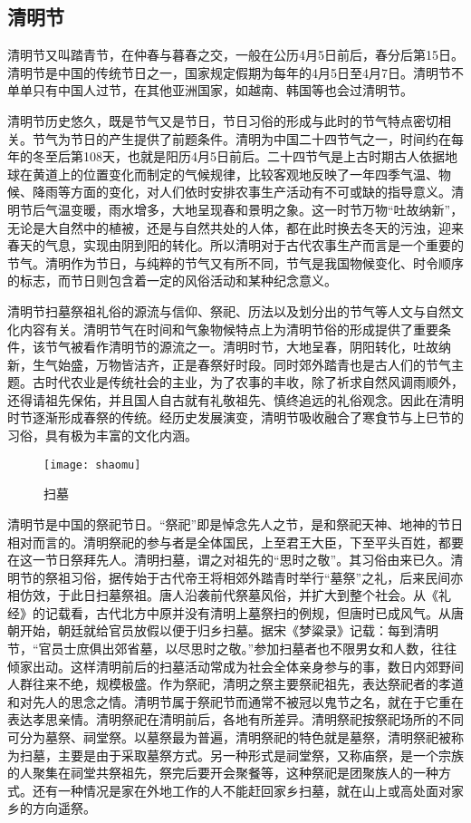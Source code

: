 \subsection{清明节}

清明节又叫踏青节，在仲春与暮春之交，一般在公历4月5日前后，春分后第15日。清明节是中国的传统节日之一，国家规定假期为每年的4月5日至4月7日。清明节不单单只有中国人过节，在其他亚洲国家，如越南、韩国等也会过清明节。

清明节历史悠久，既是节气又是节日，节日习俗的形成与此时的节气特点密切相关。节气为节日的产生提供了前题条件。清明为中国二十四节气之一，时间约在每年的冬至后第108天，也就是阳历4月5日前后。二十四节气是上古时期古人依据地球在黄道上的位置变化而制定的气候规律，比较客观地反映了一年四季气温、物候、降雨等方面的变化，对人们依时安排农事生产活动有不可或缺的指导意义。清明节后气温变暖，雨水增多，大地呈现春和景明之象。这一时节万物“吐故纳新”，无论是大自然中的植被，还是与自然共处的人体，都在此时换去冬天的污浊，迎来春天的气息，实现由阴到阳的转化。所以清明对于古代农事生产而言是一个重要的节气。清明作为节日，与纯粹的节气又有所不同，节气是我国物候变化、时令顺序的标志，而节日则包含着一定的风俗活动和某种纪念意义。

清明节扫墓祭祖礼俗的源流与信仰、祭祀、历法以及划分出的节气等人文与自然文化内容有关。清明节气在时间和气象物候特点上为清明节俗的形成提供了重要条件，该节气被看作清明节的源流之一。清明时节，大地呈春，阴阳转化，吐故纳新，生气始盛，万物皆洁齐，正是春祭好时段。同时郊外踏青也是古人们的节气主题。古时代农业是传统社会的主业，为了农事的丰收，除了祈求自然风调雨顺外，还得请祖先保佑，并且国人自古就有礼敬祖先、慎终追远的礼俗观念。因此在清明时节逐渐形成春祭的传统。经历史发展演变，清明节吸收融合了寒食节与上巳节的习俗，具有极为丰富的文化内涵。
\begin{figure}[htb]
    \centering
    \texttt{[image: shaomu]}
    \caption{扫墓}
\end{figure}


清明节是中国的祭祀节日。“祭祀”即是悼念先人之节，是和祭祀天神、地神的节日相对而言的。清明祭祀的参与者是全体国民，上至君王大臣，下至平头百姓，都要在这一节日祭拜先人。清明扫墓，谓之对祖先的“思时之敬”。其习俗由来已久。清明节的祭祖习俗，据传始于古代帝王将相郊外踏青时举行“墓祭”之礼，后来民间亦相仿效，于此日扫墓祭祖。唐人沿袭前代祭墓风俗，并扩大到整个社会。从《礼经》的记载看，古代北方中原并没有清明上墓祭扫的例规，但唐时已成风气。从唐朝开始，朝廷就给官员放假以便于归乡扫墓。据宋《梦粱录》记载：每到清明节，“官员士庶俱出郊省墓，以尽思时之敬。”参加扫墓者也不限男女和人数，往往倾家出动。这样清明前后的扫墓活动常成为社会全体亲身参与的事，数日内郊野间人群往来不绝，规模极盛。作为祭祀，清明之祭主要祭祀祖先，表达祭祀者的孝道和对先人的思念之情。清明节属于祭祀节而通常不被冠以鬼节之名，就在于它重在表达孝思亲情。清明祭祀在清明前后，各地有所差异。清明祭祀按祭祀场所的不同可分为墓祭、祠堂祭。以墓祭最为普遍，清明祭祀的特色就是墓祭，清明祭祀被称为扫墓，主要是由于采取墓祭方式。另一种形式是祠堂祭，又称庙祭，是一个宗族的人聚集在祠堂共祭祖先，祭完后要开会聚餐等，这种祭祀是团聚族人的一种方式。还有一种情况是家在外地工作的人不能赶回家乡扫墓，就在山上或高处面对家乡的方向遥祭。

